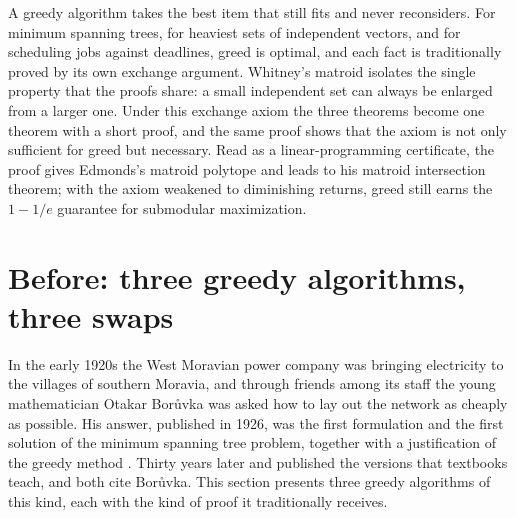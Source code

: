 \begin{refsection}

\begin{chaptersummary}
A greedy algorithm takes the best item that still fits and never reconsiders. For minimum spanning trees, for heaviest sets of independent vectors, and for scheduling jobs against deadlines, greed is optimal, and each fact is traditionally proved by its own exchange argument. Whitney's matroid isolates the single property that the proofs share: a small independent set can always be enlarged from a larger one. Under this exchange axiom the three theorems become one theorem with a short proof, and the same proof shows that the axiom is not only sufficient for greed but necessary. Read as a linear-programming certificate, the proof gives Edmonds's matroid polytope and leads to his matroid intersection theorem; with the axiom weakened to diminishing returns, greed still earns the $1-1/e$ guarantee for submodular maximization.
\end{chaptersummary}

\section{Before: three greedy algorithms, three swaps}\label{sec:matroid:before}

In the early 1920s the West Moravian power company was bringing electricity to the villages of southern Moravia, and through friends among its staff the young mathematician Otakar Bor\r{u}vka was asked how to lay out the network as cheaply as possible. His answer, published in 1926, was the first formulation and the first solution of the minimum spanning tree problem, together with a justification of the greedy method \parencite{Boruvka1926,GrahamHell1985}. Thirty years later \textcite{Kruskal1956} and \textcite{Prim1957} published the versions that textbooks teach, and both cite Bor\r{u}vka. This section presents three greedy algorithms of this kind, each with the kind of proof it traditionally receives.


\end{refsection}
